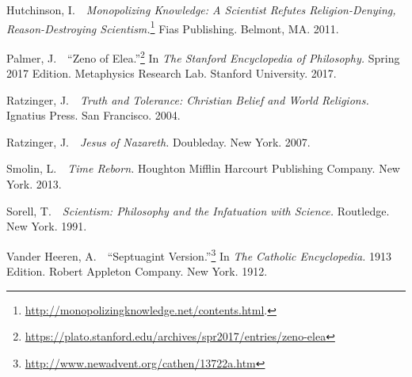 \documentclass[twocolumn]{article}
\begin{document}
\begin{thebibliography}{}
\begin{small}
      Hutchinson, I.\ \ {\it Monopolizing Knowledge: A Scientist Refutes
      Religion-Denying, Reason-Destroying Scientism.}\footnote{%
         \url{http://monopolizingknowledge.net/contents.html}.%
      }
      Fias Publishing.  Belmont, MA.  2011.

      Palmer, J.\ \ ``Zeno of Elea.''\footnote{%
         \url{https://plato.stanford.edu/archives/spr2017/entries/zeno-elea}%
      }
      In {\it The Stanford Encyclopedia of Philosophy.}  Spring 2017 Edition.
      Metaphysics Research Lab.  Stanford University.  2017.

      Ratzinger, J.\ \ {\it Truth and Tolerance: Christian Belief and World
      Religions.}  Ignatius Press.  San Francisco.  2004.

      Ratzinger, J.\ \ {\it Jesus of Nazareth.}  Doubleday.  New York.  2007.

      Smolin, L.\ \ {\it Time Reborn.}  Houghton Mifflin Harcourt Publishing
      Company.  New York.  2013.

      Sorell, T.\ \ {\it Scientism: Philosophy and the Infatuation with
      Science.}  Routledge.  New York.  1991.

      Vander Heeren, A.\ \ ``Septuagint Version.''\footnote{%
         \url{http://www.newadvent.org/cathen/13722a.htm}%
      }
      In {\it The Catholic Encyclopedia.}  1913 Edition.  Robert Appleton
      Company.  New York.  1912.

   \end{small}

\end{thebibliography}


\end{document}
